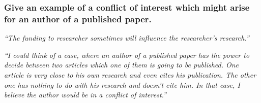 \documentclass[12pt]{beamer}
\newcommand\ans[1]{{\it ``#1''}}
\newcommand\gap{\vspace{5mm}}
\begin{document}
\begin{frame}  %
\frametitle{ 
Give an example of a conflict of interest which might arise for an author of a published paper.}

\ans{The funding to researcher sometimes will influence the researcher's research.}

\gap 

\ans{I  could  think  of  a  case,  where  an  author  of  a  published  paper  has  the  power  to  decide between  two  articles  which  one  of  them  is  going  to  be  published.   One  article  is  very close to his own research and even cites his publication.  The other one has nothing to do  with  his  research  and  doesn't  cite  him.  In  that  case,  I  believe  the  author  would  be in a conflict of interest.}





\end{frame}
\end{document}
